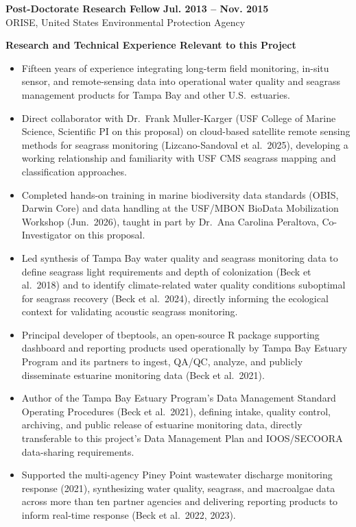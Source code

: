 \documentclass[letterpaper,12pt]{article}
\begin{document}
\vspace{2pt}
\textbf{Post-Doctorate Research Fellow} \hfill \textbf{Jul. 2013 -- Nov. 2015}\\
ORISE, United States Environmental Protection Agency

\vspace{8pt}
\noindent\textbf{Research and Technical Experience Relevant to this Project}

\vspace{4pt}
\begin{itemize}
\item Fifteen years of experience integrating long-term field monitoring, in-situ sensor, and remote-sensing data into operational water quality and seagrass management products for Tampa Bay and other U.S.\ estuaries.
\item Direct collaborator with Dr.\ Frank Muller-Karger (USF College of Marine Science, Scientific PI on this proposal) on cloud-based satellite remote sensing methods for seagrass monitoring (Lizcano-Sandoval et al.\ 2025), developing a working relationship and familiarity with USF CMS seagrass mapping and classification approaches.
\item Completed hands-on training in marine biodiversity data standards (OBIS, Darwin Core) and data handling at the USF/MBON BioData Mobilization Workshop (Jun.\ 2026), taught in part by Dr.\ Ana Carolina Peraltova, Co-Investigator on this proposal.
\item Led synthesis of Tampa Bay water quality and seagrass monitoring data to define seagrass light requirements and depth of colonization (Beck et al.\ 2018) and to identify climate-related water quality conditions suboptimal for seagrass recovery (Beck et al.\ 2024), directly informing the ecological context for validating acoustic seagrass monitoring.
\item Principal developer of tbeptools, an open-source R package supporting dashboard and reporting products used operationally by Tampa Bay Estuary Program and its partners to ingest, QA/QC, analyze, and publicly disseminate estuarine monitoring data (Beck et al.\ 2021).
\item Author of the Tampa Bay Estuary Program's Data Management Standard Operating Procedures (Beck et al.\ 2021), defining intake, quality control, archiving, and public release of estuarine monitoring data, directly transferable to this project's Data Management Plan and IOOS/SECOORA data-sharing requirements.
\item Supported the multi-agency Piney Point wastewater discharge monitoring response (2021), synthesizing water quality, seagrass, and macroalgae data across more than ten partner agencies and delivering reporting products to inform real-time response (Beck et al.\ 2022, 2023).

\end{itemize}
\end{document}
